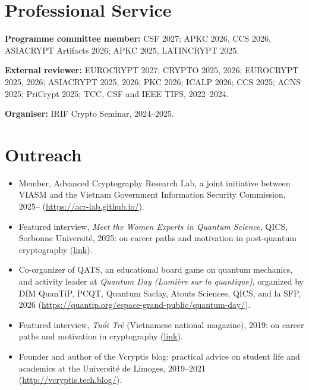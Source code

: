 \documentclass[11pt]{article}
\newcommand{\vn}[1]{{\fontencoding{T5}\selectfont #1}}
\begin{document}
\section{Professional Service}

\textbf{Programme committee member:} CSF 2027; APKC 2026, CCS 2026, ASIACRYPT Artifacts 2026;
APKC 2025, LATINCRYPT 2025.

\smallskip
\textbf{External reviewer:} EUROCRYPT 2027; CRYPTO 2025, 2026; EUROCRYPT 2025, 2026;
ASIACRYPT 2025, 2026; PKC 2026; ICALP 2026; CCS 2025; ACNS 2025;
PriCrypt 2025; TCC, CSF and IEEE TIFS, 2022--2024.

\smallskip
\textbf{Organiser:} IRIF Crypto Seminar, 2024--2025.

\section{Outreach}
\begin{itemize}
      \item Member, Advanced Cryptography Research Lab, a joint initiative between VIASM and the
            Vietnam Government Information Security Commission, 2025--
            (\url{https://acr-lab.github.io/}).
      \item Featured interview, \emph{Meet the Women Experts in Quantum Science}, QICS,
            Sorbonne Universit\'e, 2025: on career paths and motivation in post-quantum
            cryptography
            (\href{https://qics.sorbonne-universite.fr/en/news-qics/meet-women-experts-quantum-science/interview-dung-bui-postdoctoral-fellow-lip6}{link}).
      \item Co-organizer of QATS, an educational board game on quantum mechanics, and activity
            leader at \emph{Quantum Day (Lumi\`ere sur la quantique)}, organized by DIM QuanTiP,
            PCQT, Quantum Saclay, Atouts Sciences, QICS, and la SFP, 2026
            (\url{https://quantip.org/espace-grand-public/quantum-day/}).
      \item Featured interview, \emph{\vn{Tuổi Trẻ}} (Vietnamese national magazine), 2019:
            on career paths and motivation in cryptography
            (\href{https://tuoitre.vn/made-by-vietnam-khi-giac-mo-duoc-chap-canh-20190602203241824.htm}{link}).
      \item Founder and author of the Vcryptis blog: practical advice on student life and
            academics at the Universit\'e de Limoges, 2019--2021
            (\url{http://vcryptis.tech.blog/}).
\end{itemize}
\end{document}
